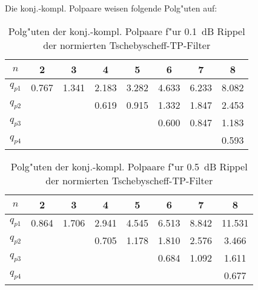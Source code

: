 \begin{table}[!htb]
Die konj.-kompl. Polpaare weisen folgende Polg"uten auf:
\begin{center}
{\footnotesize
\begin{tabular}{|c||c|c|c|c|c|c|c|}\hline
$n$ & 2 & 3 & 4 & 5 & 6 & 7 & 8 \\ \hline\hline
$q_{p1}$ & 0.767 & 1.341 & 2.183 & 3.282 & 4.633 & 6.233 & 8.082 \\ \hline
$q_{p2}$ &       &       & 0.619 & 0.915 & 1.332 & 1.847 & 2.453 \\ \hline
$q_{p3}$ &       &       &      &        & 0.600 & 0.847 & 1.183 \\ \hline
$q_{p4}$ &       &       &      &        &       &       & 0.593 \\ \hline
\end{tabular}
}
\end{center}
\vspace*{-4mm}
\caption{Polg"uten der konj.-kompl. Polpaare f"ur 0.1~dB Rippel der normierten Tschebyscheff-TP-Filter
\label{pg-0.1}}
\end{table}

\begin{table}[!htb]
\begin{center}
{\footnotesize
\begin{tabular}{|c||c|c|c|c|c|c|c|}\hline
$n$ & 2 & 3 & 4 & 5 & 6 & 7 & 8 \\ \hline\hline
$q_{p1}$ & 0.864 & 1.706 & 2.941 & 4.545 & 6.513 & 8.842 & 11.531 \\ \hline
$q_{p2}$ &       &       & 0.705 & 1.178 & 1.810 & 2.576 & 3.466 \\ \hline
$q_{p3}$ &       &       &       &       & 0.684 & 1.092 & 1.611 \\ \hline
$q_{p4}$ &       &       &       &       &       &       & 0.677 \\ \hline
\end{tabular}
}
\end{center}\vspace*{-4mm}\caption{Polg"uten der konj.-kompl. Polpaare f"ur 0.5~dB Rippel der normierten Tschebyscheff-TP-Filter}\label{pg-0.5}
\end{table}

